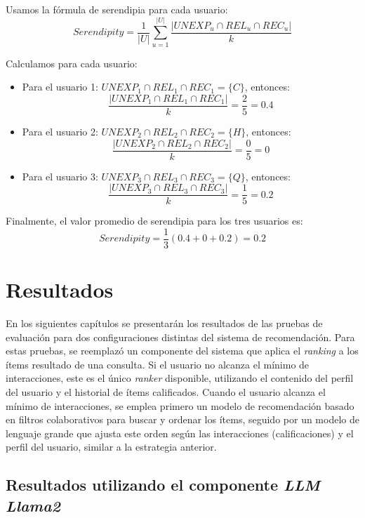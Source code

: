 \documentclass[11pt,a4paper,twoside]{thesis}
\begin{document}
Usamos la fórmula de serendipia para cada usuario:
\[
	Serendipity = \frac{1}{|U|} \sum_{u=1}^{|U|} \frac{|UNEXP_u \cap REL_u \cap REC_u|}{k}
\]

Calculamos para cada usuario:
\begin{itemize}
	\item Para el usuario 1: \( UNEXP_1 \cap REL_1 \cap REC_1 = \{C\} \), entonces:
	      \[
		      \frac{|UNEXP_1 \cap REL_1 \cap REC_1|}{k} = \frac{2}{5} = 0.4
	      \]
	\item Para el usuario 2: \( UNEXP_2 \cap REL_2 \cap REC_2 = \{H\} \), entonces:
	      \[
		      \frac{|UNEXP_2 \cap REL_2 \cap REC_2|}{k} = \frac{0}{5} = 0
	      \]
	\item Para el usuario 3: \( UNEXP_3 \cap REL_3 \cap REC_3 = \{Q\} \), entonces:
	      \[
		      \frac{|UNEXP_3 \cap REL_3 \cap REC_3|}{k} = \frac{1}{5} = 0.2
	      \]
\end{itemize}

Finalmente, el valor promedio de serendipia para los tres usuarios es:
\[
	Serendipity = \frac{1}{3} (0.4 + 0 + 0.2) = 0.2
\]


\chapter{Resultados}

En los siguientes capítulos se presentarán los resultados de las pruebas de evaluación para dos configuraciones distintas del sistema de recomendación. Para estas pruebas, se reemplazó un componente del sistema que aplica el \textit{ranking} a los ítems resultado de una consulta. Si el usuario no alcanza el mínimo de interacciones, este es el único \textit{ranker} disponible, utilizando el contenido del perfil del usuario y el historial de ítems calificados. Cuando el usuario alcanza el mínimo de interacciones, se emplea primero un modelo de recomendación basado en filtros colaborativos para buscar y ordenar los ítems, seguido por un modelo de lenguaje grande que ajusta este orden según las interacciones (calificaciones) y el perfil del usuario, similar a la estrategia anterior.

\section{Resultados utilizando el componente \textit{LLM} \textit{Llama2}}
\end{document}

